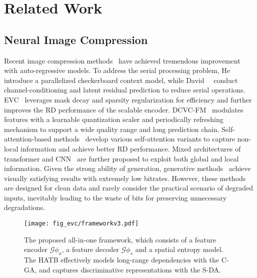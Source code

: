 \section{Related Work}
\label{sec:related}\vspace{-0.05in}
 \subsection{Neural Image Compression}\vspace{-0.05in}
Recent image compression methods~\cite{balle, variational, minnen2018joint, guo2021causal} have achieved tremendous improvement with auto-regressive models.
 To address the serial processing problem, He~\etal~\cite{he2021checkerboard} introduce a parallelized checkerboard context model, while David~\etal~\cite{minnen2020channel} conduct channel-conditioning and latent residual prediction to reduce serial operations. EVC~\cite{evc} leverages mask decay and sparsity regularization for efficiency and further improves the RD performance of the scalable encoder. 
 DCVC-FM~\cite{dmci} modulates features with a learnable quantization scaler and periodically refreshing mechanism to support a wide quality range and long prediction chain. Self-attention-based methods~\cite{cheng2020learned, zhu2021transformer, qian2022entroformer, koyuncu2022contextformer} develop various self-attention variants to capture non-local information and achieve better RD performance. Mixed architectures of transformer and CNN~\cite{zou2022devil, mixed} are further proposed to exploit both global and local information.  Given the strong ability of generation, generative methods~\cite{agustsson2019generative,agustsson2023multi} achieve visually satisfying results with extremely low bitrates. However, these methods are designed for clean data and rarely consider the practical scenario of degraded inputs, inevitably leading to the waste of bits for preserving unnecessary degradations.  
 
  
 \begin{figure*}[t]
\centering
\vspace{-4pt}\texttt{[image: fig\_evc/frameworkv3.pdf]}\vspace{-6pt}
\caption{The proposed all-in-one framework, which consists of a feature encoder $\mathcal{G}{\phi_a}$, a feature decoder $\mathcal{G}{\phi_s}$ and a spatial entropy model. The HATB effectively models long-range dependencies with the C-GA, and captures discriminative representations with the S-DA.  }\vspace{-0.15in}  
\label{fig:overview}
\end{figure*}

